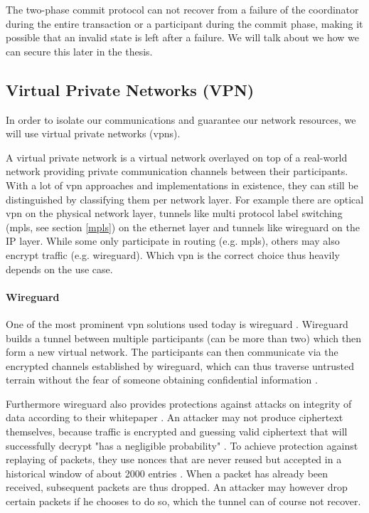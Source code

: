 The two-phase commit protocol can not recover from a failure of the coordinator during the entire transaction or a participant during the commit phase, making it possible that an invalid state is left after a failure. We will talk about we how we can secure this later in the thesis.


\subsection{Virtual Private Networks (VPN)}
In order to isolate our communications and guarantee our network resources, we will use virtual private networks (\acrshort{vpn}s).

A virtual private network \cite{vpn} is a virtual network overlayed on top of a real-world network providing private communication channels between their participants. With a lot of \acrshort{vpn} approaches and implementations in existence, they can still be distinguished by classifying them per network layer. For example there are optical \acrshort{vpn} on the physical network layer, tunnels like multi protocol label switching (\acrshort{mpls}, see section \ref{mpls}) on the ethernet layer and tunnels like wireguard \cite{wireguard} on the IP layer. While some only participate in routing (e.g. \acrshort{mpls}), others may also encrypt traffic (e.g. wireguard). Which \acrshort{vpn} is the correct choice thus heavily depends on the use case.

\paragraph{Wireguard} One of the most prominent \acrshort{vpn} solutions used today is wireguard \cite{wireguard}. Wireguard builds a tunnel between multiple participants (can be more than two) which then form a new virtual network. The participants can then communicate via the encrypted channels established by wireguard, which can thus traverse untrusted terrain without the fear of someone obtaining confidential information \cite{wireguard}.

Furthermore wireguard also provides protections against attacks on integrity of data according to their whitepaper \cite{wireguard}. An attacker may not produce ciphertext themselves, because traffic is encrypted and guessing valid ciphertext that will successfully decrypt "has a negligible probability" \cite{wireguardcrypto}. To achieve protection against replaying of packets, they use nonces that are never reused but accepted in a historical window of about 2000 entries \cite{wireguardproto}. When a packet has already been received, subsequent packets are thus dropped. An attacker may however drop certain packets if he chooses to do so, which the tunnel can of course not recover.

